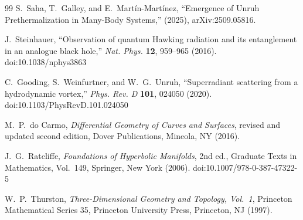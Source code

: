 \documentclass[10pt,reprint,aps,onecolumn,nofootinbib]{revtex4-2}
\begin{document}
\begin{thebibliography}{99}
        S.~Saha, T.~Galley, and E.~Mart\'in-Mart\'inez,
        ``Emergence of Unruh Prethermalization in Many-Body Systems,''
        (2025), arXiv:2509.05816.

        J.~Steinhauer,
        ``Observation of quantum Hawking radiation and its entanglement in an analogue black hole,''
        \textit{Nat. Phys.} \textbf{12}, 959--965 (2016).
        doi:10.1038/nphys3863

        C.~Gooding, S.~Weinfurtner, and W.~G.~Unruh,
        ``Superradiant scattering from a hydrodynamic vortex,''
        \textit{Phys. Rev. D} \textbf{101}, 024050 (2020).
        doi:10.1103/PhysRevD.101.024050

        M.~P.~do Carmo,
        \textit{Differential Geometry of Curves and Surfaces},
        revised and updated second edition,
        Dover Publications, Mineola, NY (2016).

        J.~G.~Ratcliffe,
        \textit{Foundations of Hyperbolic Manifolds}, 2nd ed.,
        Graduate Texts in Mathematics, Vol.~149,
        Springer, New York (2006).
        doi:10.1007/978-0-387-47322-5

        W.~P.~Thurston,
        \textit{Three-Dimensional Geometry and Topology, Vol.~1},
        Princeton Mathematical Series 35,
        Princeton University Press, Princeton, NJ (1997).
    \end{thebibliography}
\end{document}
